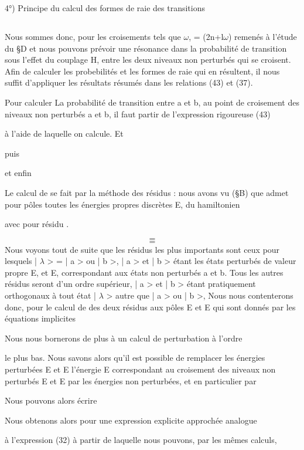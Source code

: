 4°) Principe du calcul des formes de raie des transitions
\subsection{}%
Nous sommes donc, pour les croisements tels que $\omega$, = (2n+l$\omega$)
remenés à l'étude du \S D et nous pouvons prévoir une résonance dans la probabilité
de transition sous l'effet du couplage H, entre les deux niveaux non
perturbés qui se croisent. Afin de calculer les probebilités et les formes de
raie qui en résultent, il nous suffit d'appliquer les résultats résumés dans
les relations (43) et (37).

Pour calculer La probabilité de transition entre a et b, au point de croisement
des niveaux non perturbés a et b, il faut partir de l'expression rigoureuse (43)

à l'aide de laquelle on calcule. Et

puis

et enfin

Le calcul de  se fait par la méthode des résidus : nous avons vu (\S B) que
 admet pour pôles toutes les énergies propres discrètes E, du hamiltonien

 avec pour résidu .


\[
\tag{51}=
\]
\[
\tag{52}=
\]
Nous voyons tout de suite que les résidus les plus importants sont ceux pour
lesquels | $\lambda$ > = | a > ou | b >, | a > et | b > étant les états perturbés de
valeur propre E, et E, correspondant aux états non perturbés a et b. Tous
les autres résidus seront d'un ordre supérieur, | a > et | b > étant pratiquement
orthogonaux à tout état | $\lambda$ > autre que | a > ou | b >, Nous nous contenterons donc,
pour le calcul de  des deux résidus aux pôles E et E
qui sont donnés par les équations implicites

Nous nous bornerons de plus à un calcul de perturbation à l'ordre

le plus bas. Nous savons alors qu'il est possible de remplacer les énergies
perturbées E et E
l'énergie E correspondant au croisement des niveaux non perturbés E et E
par les énergies non perturbées, et en particulier par

Nous pouvons alors écrire

Nous obtenons alors pour  une expression explicite approchée analogue

à l'expression (32) à partir de laquelle nous pouvons, par les mêmes calculs,

